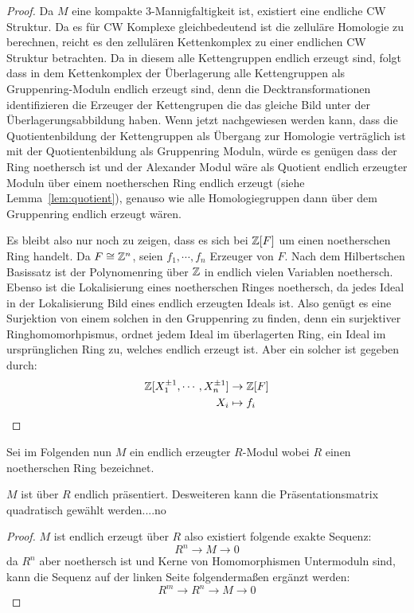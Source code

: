 \begin{proof}
Da $M$ eine kompakte 3-Mannigfaltigkeit ist, existiert eine endliche CW Struktur. Da es für CW Komplexe gleichbedeutend ist die zelluläre Homologie zu berechnen, reicht es den zellulären Kettenkomplex zu einer endlichen CW Struktur betrachten. Da in diesem alle Kettengruppen endlich erzeugt sind, folgt dass in dem Kettenkomplex der Überlagerung alle Kettengruppen als Gruppenring-Moduln endlich erzeugt sind, denn die Decktransformationen identifizieren die Erzeuger der Kettengrupen die das gleiche Bild unter der Überlagerungsabbildung haben. Wenn jetzt nachgewiesen werden kann, dass die Quotientenbildung der Kettengruppen als Übergang zur Homologie verträglich ist mit der Quotientenbildung als Gruppenring Moduln, würde es genügen dass der Ring noethersch ist und der Alexander Modul wäre als Quotient endlich erzeugter Moduln über einem noetherschen Ring endlich erzeugt (siehe Lemma~\ref{lem:quotient}), genauso wie alle Homologiegruppen dann über dem Gruppenring endlich erzeugt wären.

	Es bleibt also nur noch zu zeigen, dass es sich bei $\mathbb{Z}[F]$ um einen noetherschen Ring handelt. Da $F\cong \mathbb{Z}^n$, seien $f_1,\cdots,f_n$ Erzeuger von $F$. Nach dem Hilbertschen Basissatz ist der Polynomenring über $\mathbb{Z}$ in endlich vielen Variablen noethersch. Ebenso ist die Lokalisierung eines noetherschen Ringes noethersch, da jedes Ideal in der Lokalisierung Bild eines endlich erzeugten Ideals ist. Also genügt es eine Surjektion von einem solchen in den Gruppenring zu finden, denn ein surjektiver Ringhomomorhpismus, ordnet jedem Ideal im überlagerten Ring, ein Ideal im ursprünglichen Ring zu, welches endlich erzeugt ist. Aber ein solcher ist gegeben durch:
	\begin{align*}
			\mathbb{Z}[X_1^{\pm 1},\cdots,X_{n}^{\pm 1}] & \to  \mathbb{Z}[F]\\
			X_i &\mapsto  f_i
	\end{align*}
\end{proof}


Sei im Folgenden nun $M$ ein endlich erzeugter $R$-Modul wobei $R$ einen noetherschen Ring bezeichnet.
\begin{lem}
	$M$ ist über $R$ endlich präsentiert. Desweiteren kann die Präsentationsmatrix quadratisch gewählt werden....no
\end{lem}
\begin{proof}
	$M$ ist endlich erzeugt über $R$ also existiert folgende exakte Sequenz:
	\[
		R^n \to M \to 0
	\]
	da $R^n$ aber noethersch ist und Kerne von Homomorphismen Untermoduln sind, kann die Sequenz auf der linken Seite folgendermaßen ergänzt werden:
	\[
		R^m \to R^n \to M \to 0
	\]
\end{proof}

